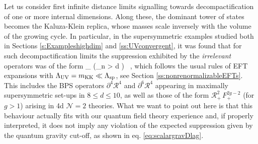 Let us consider first infinite distance limits signalling towards decompactification of one or more internal dimensions. Along these, the dominant tower of states becomes the Kaluza-Klein replica, whose masses scale inversely with the volume of the growing cycle. In particular, in the supersymmetric examples studied both in Sections \ref{s:Exampleshighdim} and \ref{ss:UVconvergent}, it was found that for such decompactification limits the suppression exhibited by the \emph{irrelevant} operators was of the form
%
\beq
{}_{} \supset {} \left(\sum_{n > d} \right) \, ,
\label{eq:gravEFTexpansionII}
\eeq
%
which follows the usual rules of EFT expansions with $\Lambda_{\rm UV}=m_{\rm KK} \ll \Lambda_{\text{sp}}$, see Section \ref{ss:nonrenormalizableEFTs}. This includes the BPS operators $\partial^4 \mathcal{R}^4$ and $\partial^6 \mathcal{R}^4$ appearing in maximally supersymmetric set-ups in $8\leq d \leq 10$, as well as those of the form $\mathcal{R}_+^2\, F_+^{2g-2}$ (for $g>1$) arising in 4d $\mathcal{N}=2$ theories. What we want to point out here is that this behaviour actually fits with our quantum field theory experience and, if properly interpreted, it does not imply any violation of the expected suppression given by the quantum gravity cut-off, as shown in eq. \eqref{eq:scalargravDlag}.

